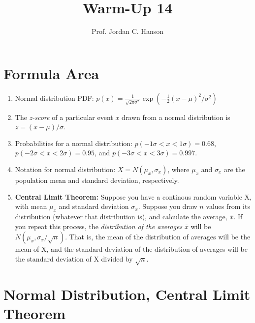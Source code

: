 \documentclass{article}
\begin{document}
\title{Warm-Up 14}
\author{Prof. Jordan C. Hanson}

\maketitle

\section{Formula Area}

\begin{enumerate}
\item Normal distribution PDF: $p(x) = \frac{1}{\sqrt{2\pi \sigma^2}} \exp\left( -\frac{1}{2}(x-\mu)^2/\sigma^2 \right)$
\item The \textit{z-score} of a particular event $x$ drawn from a normal distribution is $z = (x-\mu)/\sigma$.
\item Probabilities for a normal distribution: $p(-1\sigma < x < 1\sigma) = 0.68$, $p(-2\sigma < x < 2\sigma) = 0.95$, and $p(-3\sigma < x < 3\sigma) = 0.997$.
\item Notation for normal distribution: $X = N(\mu_x,\sigma_x)$, where $\mu_x$ and $\sigma_x$ are the population mean and standard deviation, respectively.
\item \textbf{Central Limit Theorem:} Suppose you have a continous random variable X, with mean $\mu_x$ and standard deviation $\sigma_x$.  Suppose you draw $n$ values from its distribution (whatever that distribution is), and calculate the average, $\bar{x}$.  If you repeat this process, the \textit{distribution of the averages} $\bar{x}$ will be $N(\mu_x,\sigma_x/\sqrt{n})$.  That is, the mean of the distribution of averages will be the mean of X, and the standard deviation of the distribution of averages will be the standard deviation of X divided by $\sqrt{n}$.
\end{enumerate}

\section{Normal Distribution, Central Limit Theorem}
\end{document}
